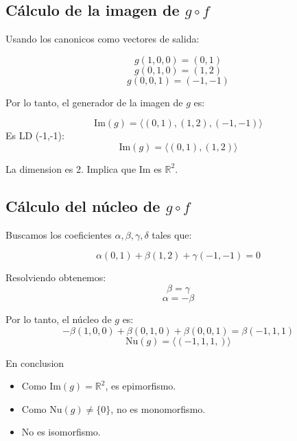 \subsection*{Cálculo de la imagen de \( g\circ f \)}

Usando los canonicos como vectores de salida:

\[ g(1,0,0) = (0,1) \]
\[ g(0,1,0) = (1,2) \]
\[ g(0,0,1) = (-1,-1) \]

Por lo tanto, el generador de la imagen de \( g \) es:

\[ \text{Im}(g) = \langle (0,1), (1,2), (-1,-1) \rangle \]
Es LD (-1,-1):
\[ \text{Im}(g) = \langle (0,1), (1,2) \rangle \]


La dimension es 2. Implica que Im es \( \mathbb{R}^2 \).

\subsection*{Cálculo del núcleo de \( g \circ f \)}

Buscamos los coeficientes \( \alpha, \beta, \gamma, \delta \) tales que:

\[ \alpha(0,1) + \beta(1,2) + \gamma(-1,-1) = 0 \]

Resolviendo obtenemos:
\[ \beta = \gamma\]
\[ \alpha = -\beta \]

Por lo tanto, el núcleo de \( g \) es:
\[ -\beta(1,0,0) + \beta(0,1,0) + \beta(0,0,1) = \beta(-1,1,1) \]
\[ \text{Nu}(g) = \langle (-1,1,1,) \rangle \]

En conclusion

\begin{itemize}
  \item Como \( \text{Im}(g) = \mathbb{R}^2 \), es epimorfismo.
  \item Como \( \text{Nu}(g) \neq \{0\} \), no es monomorfismo.
  \item No es isomorfismo.
\end{itemize}

\begin{aportes}
    \item {}
\end{aportes}